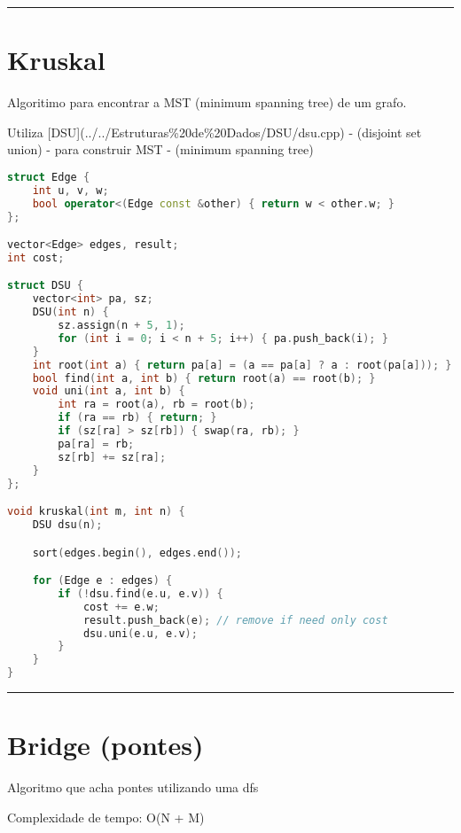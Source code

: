 \documentclass[11pt, a4paper, twoside]{book}
\begin{document}
\hfill

\rule{\textwidth}{0.4pt}

\section{Kruskal}



Algoritimo para encontrar a MST (minimum spanning tree) de um grafo.



Utiliza [DSU](../../Estruturas\%20de\%20Dados/DSU/dsu.cpp) - (disjoint set union) - para construir MST - (minimum spanning tree)




\hfill

\begin{lstlisting}[language=C++]
struct Edge {
    int u, v, w;
    bool operator<(Edge const &other) { return w < other.w; }
};

vector<Edge> edges, result;
int cost;

struct DSU {
    vector<int> pa, sz;
    DSU(int n) {
        sz.assign(n + 5, 1);
        for (int i = 0; i < n + 5; i++) { pa.push_back(i); }
    }
    int root(int a) { return pa[a] = (a == pa[a] ? a : root(pa[a])); }
    bool find(int a, int b) { return root(a) == root(b); }
    void uni(int a, int b) {
        int ra = root(a), rb = root(b);
        if (ra == rb) { return; }
        if (sz[ra] > sz[rb]) { swap(ra, rb); }
        pa[ra] = rb;
        sz[rb] += sz[ra];
    }
};

void kruskal(int m, int n) {
    DSU dsu(n);

    sort(edges.begin(), edges.end());

    for (Edge e : edges) {
        if (!dsu.find(e.u, e.v)) {
            cost += e.w;
            result.push_back(e); // remove if need only cost
            dsu.uni(e.u, e.v);
        }
    }
}
\end{lstlisting}

\hfill

\rule{\textwidth}{0.4pt}

\section{Bridge (pontes)}



Algoritmo que acha pontes utilizando uma dfs



Complexidade de tempo: O(N + M)
\end{document}
